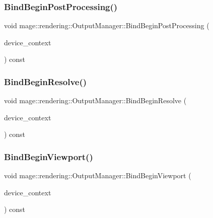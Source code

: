 \subsubsection{\texorpdfstring{Bind\+Begin\+Post\+Processing()}{BindBeginPostProcessing()}}
{\footnotesize\ttfamily void mage\+::rendering\+::\+Output\+Manager\+::\+Bind\+Begin\+Post\+Processing (\begin{DoxyParamCaption}\item[{I\+D3\+D11\+Device\+Context \&}]{device\+\_\+context }\end{DoxyParamCaption}) const\hspace{0.3cm}{\ttfamily [noexcept]}}

\hypertarget{classmage_1_1rendering_1_1_output_manager_affa0c4b4c9c56807fe8ad4ed802fdfd9}{}\label{classmage_1_1rendering_1_1_output_manager_affa0c4b4c9c56807fe8ad4ed802fdfd9} 
\subsubsection{\texorpdfstring{Bind\+Begin\+Resolve()}{BindBeginResolve()}}
{\footnotesize\ttfamily void mage\+::rendering\+::\+Output\+Manager\+::\+Bind\+Begin\+Resolve (\begin{DoxyParamCaption}\item[{I\+D3\+D11\+Device\+Context \&}]{device\+\_\+context }\end{DoxyParamCaption}) const\hspace{0.3cm}{\ttfamily [noexcept]}}

\hypertarget{classmage_1_1rendering_1_1_output_manager_a9101e210c5b04fefc52f2f14473c5742}{}\label{classmage_1_1rendering_1_1_output_manager_a9101e210c5b04fefc52f2f14473c5742} 
\subsubsection{\texorpdfstring{Bind\+Begin\+Viewport()}{BindBeginViewport()}}
{\footnotesize\ttfamily void mage\+::rendering\+::\+Output\+Manager\+::\+Bind\+Begin\+Viewport (\begin{DoxyParamCaption}\item[{I\+D3\+D11\+Device\+Context \&}]{device\+\_\+context }\end{DoxyParamCaption}) const\hspace{0.3cm}{\ttfamily [noexcept]}}

